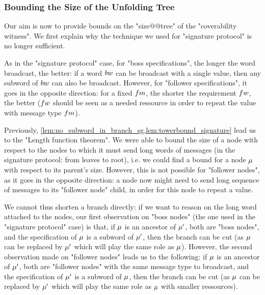 



\subsubsection{Bounding the Size of the Unfolding Tree}
\label{sec:tree-bounds}

Our aim is now to provide bounds on the "size@@tree" of the "coverability witness".  We first explain why the technique we used for "signature protocol" is no longer sufficient.

As in the "signature protocol" case, for "boss specifications", the longer the word broadcast, the better: if a word $\bossspec$ can be broadcast with a single value, then any subword of $\bossspec$ can also be broadcast. 
However, for "follower specifications", it goes in the opposite direction: for a fixed $\followmessagespec$, the shorter the requirement $\followwordspec$, the better ($\followwordspec$ should be seen as a needed ressource in order to repeat the value with message type $\followmessagespec$). 

Previously, \cref{lem:no_subword_in_branch_sg,lem:towerbound_signature} lead us to the "Length function theorem". We were able to bound the size of a node with respect to the nodes to which it must send long words of messages (in the signature protocol: from leaves to root), i.e. we could find a bound for a node $\mu$ with respect to its parent's size. However, this is not possible for "follower nodes", as it goes in the opposite direction: a node now might need to send long sequence of messages to its "follower node" child, in order for this node to repeat a value. 


We cannot thus shorten a branch directly: if we want to reason on the long word attached to the nodes, our first observation on "boss nodes" (the one used in the "signature protocol" case) is that, if $\mu$ is an ancestor of $\mu'$, both are "boss nodes", and the specification of $\mu$ is a subword of $\mu'$, then the branch can be cut (as $\mu$ can be replaced by $\mu'$ which will play the same role as $\mu$). However, the second observation made on "follower nodes" leads us to the following: if $\mu$ is an ancestor of $\mu'$, both are "follower nodes" with the same message type to broadcast, and the specification of $\mu'$ is a subword of $\mu$, then the branch can be cut (as $\mu$ can be replaced by $\mu'$ which will play the same role as $\mu$ with smaller ressources). 

